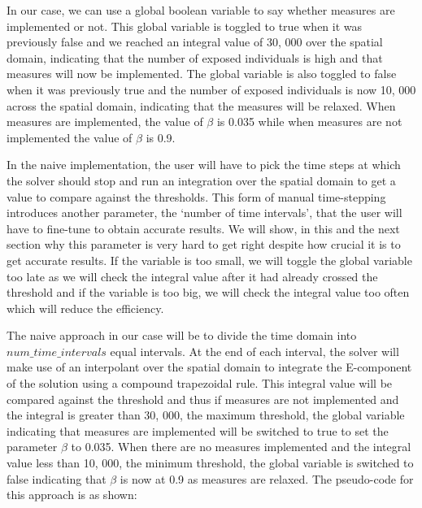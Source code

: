 \documentclass{article}
\begin{document}
In our case, we can use a global boolean variable to say whether measures are implemented or not. This global variable is toggled to true when it was previously false and we reached an integral value of 30, 000 over the spatial domain, indicating that the number of exposed individuals is high and that measures will now be implemented. The global variable is also toggled to false when it was previously true and the number of exposed individuals is now 10, 000 across the spatial domain, indicating that the measures will be relaxed. When measures are implemented, the value of $\beta$ is 0.035 while when measures are not implemented the value of $\beta$ is 0.9.

In the naive implementation, the user will have to pick the time steps at which the solver should stop and run an integration over the spatial domain to get a value to compare against the thresholds. This form of manual time-stepping introduces another parameter, the `number of time intervals', that the user will have to fine-tune to obtain accurate results. We will show, in this and the next section why this parameter is very hard to get right despite how crucial it is to get accurate results. If the variable is too small, we will toggle the global variable too late as we will check the integral value after it had already crossed the threshold and if the variable is too big, we will check the integral value too often which will reduce the efficiency. 

The naive approach in our case will be to divide the time domain into $num\_time\_intervals$ equal intervals. At the end of each interval, the solver will make use of an interpolant over the spatial domain to integrate the E-component of the solution using a compound trapezoidal rule. This integral value will be compared against the threshold and thus if measures are not implemented and the integral is greater than 30, 000, the maximum threshold, the global variable indicating that measures are implemented will be switched to true to set the parameter $\beta$ to 0.035. When there are no measures implemented and the integral value less than 10, 000, the minimum threshold, the global variable is switched to false indicating that $\beta$ is now at 0.9 as measures are relaxed. The pseudo-code for this approach is as shown:
\end{document}
